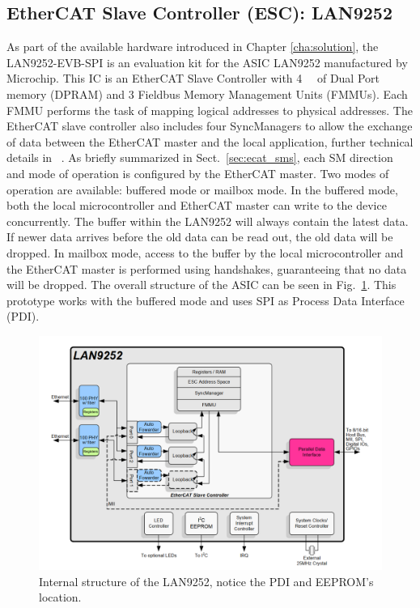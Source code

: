 \subsection{EtherCAT Slave Controller (ESC): LAN9252} 
As part of the available hardware introduced in Chapter \ref{cha:solution}, the LAN9252-EVB-SPI is an evaluation kit for the ASIC LAN9252 manufactured by Microchip. 
This IC is an EtherCAT Slave Controller with \SI{4}{\kilo\byte} of Dual Port memory (DPRAM) and 3 Fieldbus Memory Management Units (FMMUs). 
Each FMMU performs the task of mapping logical addresses to physical addresses.
The EtherCAT slave controller also includes four SyncManagers to allow the exchange of data between the EtherCAT master and the 
local application, further technical details in ~\cite{lan9252_data}.%
As briefly summarized in Sect.~\ref{sec:ecat_sms}, each SM direction and mode of operation is configured by the EtherCAT master. Two modes of operation 
are available: buffered mode or mailbox mode. 
In the buffered mode, both the local microcontroller and EtherCAT master can write to the device concurrently. The buffer within the LAN9252 
will always contain the latest data. If newer data arrives before the old data can be read out, the old data will be dropped. In mailbox
mode, access to the buffer by the local microcontroller and the EtherCAT master is performed using handshakes, guaranteeing that no data 
will be dropped. The overall structure of the ASIC can be seen in Fig.~\ref{fig:lan92struct}. This prototype works with the buffered mode and uses SPI as Process Data Interface (PDI).


\begin{figure}[ht]
  \centering
  \includegraphics[width=\textwidth]{imgs/impl-lan-structure.PNG}
  \caption{Internal structure of the LAN9252, notice the PDI and EEPROM's location.}
  \label{fig:lan92struct}
\end{figure}


